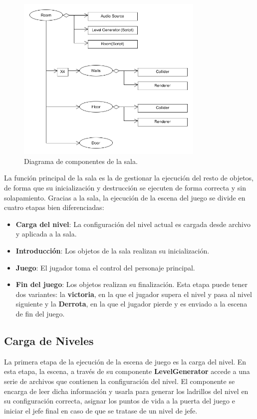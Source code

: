 \begin{figure}[h]
	\includegraphics[width=0.8\textwidth]{images/estructura/niveles/room}
	\centering
	\caption{Diagrama de componentes de la sala.}
	\label{diagrama_sala}
\end{figure}

La función principal de la sala es la de gestionar la ejecución del resto de objetos, de forma que su inicialización y destrucción se ejecuten de forma correcta y sin solapamiento. Gracias a la sala, la ejecución de la escena del juego se divide en cuatro etapas bien diferenciadas:
\begin{itemize}
\item \textbf{Carga del nivel}: La configuración del nivel actual es cargada desde archivo y aplicada a la sala.
\item \textbf{Introducción}: Los objetos de la sala realizan su inicialización.
\item \textbf{Juego}: El jugador toma el control del personaje principal.
\item \textbf{Fin del juego}: Los objetos realizan su finalización. Esta etapa puede tener dos variantes: la \textbf{victoria}, en la que el jugador supera el nivel y pasa al nivel siguiente y la \textbf{Derrota}, en la que el jugador pierde y es enviado a la escena de fin del juego.
\end{itemize}

\subsection{Carga de Niveles}
La primera etapa de la ejecución de la escena de juego es la carga del nivel. En esta etapa, la escena, a través de su componente \textbf{LevelGenerator} accede a una serie de archivos que contienen la configuración del nivel. El componente se encarga de leer dicha información y usarla para generar los ladrillos del nivel en su configuración correcta, asignar los puntos de vida a la puerta del juego e iniciar el jefe final en caso de que se tratase de un nivel de jefe.


